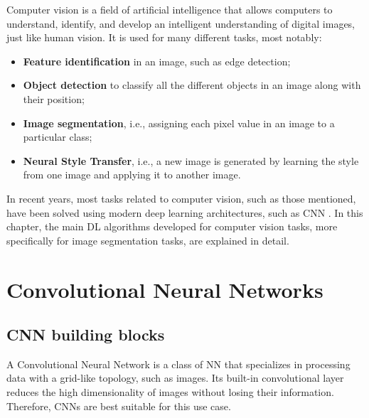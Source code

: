 \cleardoublepage
\label{chapter:background}
Computer vision is a field of artificial intelligence that allows computers to understand, identify, and develop an intelligent understanding of digital images, just like human vision. It is used for many different tasks, most notably:

\begin{itemize}
    \item \textbf{Feature identification} in an image, such as edge detection;
    \item \textbf{Object detection} to classify all the different objects in an image along with their position;
    \item \textbf{Image segmentation}, i.e., assigning each pixel value in an image to a particular class;
    \item \textbf{Neural Style Transfer}, i.e., a new image is generated by learning the style from one image and applying it to another image.
\end{itemize}

In recent years, most tasks related to computer vision, such as those mentioned, have been solved using modern deep learning architectures, such as \ac{CNN} \cite{review:CV}. In this chapter, the main \ac{DL} algorithms developed for computer vision tasks, more specifically for image segmentation tasks, are explained in detail. 

\section{Convolutional Neural Networks}
\label{section:CNN&UNET}


\subsection{CNN building blocks}

A Convolutional Neural Network is a class of \ac{NN} that specializes in processing data with a grid-like topology, such as images. Its built-in convolutional layer reduces the high dimensionality of images without losing their information. Therefore, CNNs are best suitable for this use case.

